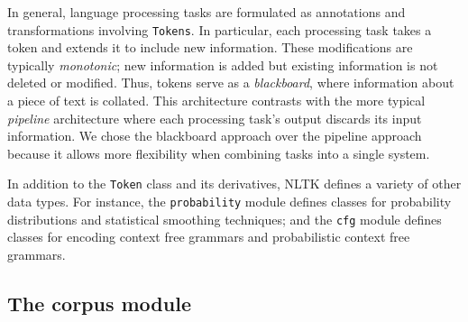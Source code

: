 \documentclass[11pt]{article}
\def\object#1{\texttt{\small #1}}
\begin{document}
In general, language processing tasks are formulated as
annotations and transformations involving \object{Tokens}.  In
particular, each processing task takes a token and extends it to
include new information.  These modifications are typically
\emph{monotonic}; new information is added but
existing information is not deleted or modified.  Thus, tokens serve
as a \emph{blackboard}, where information about a piece of text is
collated.  This architecture contrasts with the more typical
\emph{pipeline} architecture where each processing task's output
discards its input information.  We chose the blackboard approach
over the pipeline approach because it allows more flexibility when
combining tasks into a single system.

In addition to the \object{Token} class and its derivatives, NLTK
defines a variety of other data types.  For instance, the
\object{probability} module defines classes for
probability distributions and statistical smoothing techniques; and
the \object{cfg} module defines classes for encoding context free
grammars and probabilistic context free grammars.

\subsection{The corpus module}
\end{document}
